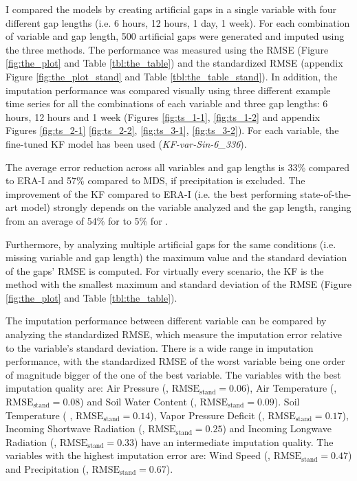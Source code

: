 \documentclass{article}
\begin{document}
I compared the models by creating artificial gaps in a single variable with four different gap lengths (i.e. 6 hours, 12 hours, 1 day, 1 week).
For each combination of variable and gap length, 500 artificial gaps were generated and imputed using the three methods. The performance was measured using the RMSE (Figure \ref{fig:the_plot} and Table \ref{tbl:the_table}) and the standardized RMSE (appendix Figure \ref{fig:the_plot_stand} and Table \ref{tbl:the_table_stand}). In addition, the imputation performance was compared visually using three different example time series for all the combinations of each variable and three gap lengths: 6 hours, 12 hours and 1 week (Figures \ref{fig:ts_1-1}, \ref{fig:ts_1-2} and appendix Figures \ref{fig:ts_2-1} \ref{fig:ts_2-2}, \ref{fig:ts_3-1}, \ref{fig:ts_3-2}). For each variable, the fine-tuned KF model has been used (\textit{KF-\textlangle var\textrangle-Sin-6\_336}).

The average error reduction across all variables and gap lengths is 33\% compared to ERA-I and 57\% compared to MDS, if precipitation is excluded.
The improvement of the KF compared to ERA-I (i.e. the best performing state-of-the-art model) strongly depends on the variable analyzed and the gap length, ranging from an average of 54\% for  to 5\% for .

Furthermore, by analyzing multiple artificial gaps for the same conditions (i.e. missing variable and gap length) the maximum value and the standard deviation of the gaps' RMSE is computed.
For virtually every scenario, the KF is the method with the smallest maximum and standard deviation of the RMSE (Figure \ref{fig:the_plot} and Table \ref{tbl:the_table}).

The imputation performance between different variable can be compared by analyzing the standardized RMSE, which measure the imputation error relative to the variable's standard deviation.
There is a wide range in imputation performance, with the standardized RMSE of the worst variable being one order of magnitude bigger of the one of the best variable.
The variables with the best imputation quality are:
Air Pressure (, $\text{RMSE}_{\text{stand}} = 0.06$),
Air Temperature (, $\text{RMSE}_{\text{stand}} = 0.08$) and
Soil Water Content (, $\text{RMSE}_{\text{stand}} = 0.09$).
Soil Temperature ( , $\text{RMSE}_{\text{stand}} = 0.14$),
Vapor Pressure Deficit (, $\text{RMSE}_{\text{stand}} = 0.17$),
Incoming Shortwave Radiation (, $\text{RMSE}_{\text{stand}} = 0.25$) and
Incoming Longwave Radiation (, $\text{RMSE}_{\text{stand}} = 0.33$)
have an intermediate imputation quality.
The variables with the highest imputation error are: Wind Speed (, $\text{RMSE}_{\text{stand}} = 0.47$) and  Precipitation (, $\text{RMSE}_{\text{stand}} = 0.67$).
\end{document}
